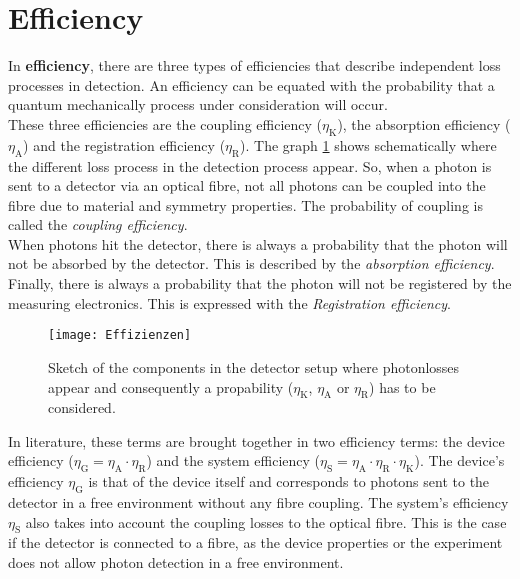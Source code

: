 \section{Efficiency}
In \textbf{efficiency}, there are three types of efficiencies that describe independent loss processes in detection.
An efficiency can be equated with the probability that a quantum mechanically process under consideration will occur.\\
These three efficiencies are the coupling efficiency ($\eta_{\text{K}}$),
the absorption efficiency ($\eta_{\text{A}}$) and the registration efficiency ($\eta_{\text{R}}$).
The graph \ref{fig: single_efficiency_terms} shows schematically where the different loss process in the detection
process appear. So, when a photon is sent to a detector via an optical fibre, not all photons can be coupled into the
fibre due to material and symmetry properties.
The probability of coupling is called the \textit{coupling efficiency}. \\
When photons hit the detector, there is always a probability that the photon will not be absorbed by the detector.
This is described by the \textit{absorption efficiency}. \\
Finally, there is always a probability that the photon will not be registered by the measuring electronics.
This is expressed with the \textit{Registration efficiency}. \\

\begin{figure}[hhh]
\texttt{[image: Effizienzen]}
\caption{Sketch of the components in the detector setup where photonlosses appear and consequently a propability
 ($\eta_{\text{K}}$, $\eta_{\text{A}}$ or $\eta_{\text{R}}$) has to be considered.}
\label{fig: single_efficiency_terms}
\end{figure}

In literature, these terms are brought together in two efficiency terms: the device efficiency
($\eta_{\text{G}} = \eta_{\text{A}} \cdot \eta_{\text{R}}$) and the system efficiency
($\eta_{\text{S}} = \eta_{\text{A}} \cdot \eta_{\text{R}} \cdot \eta_{\text{K}}$).
The device's efficiency $\eta_{\text{G}}$ is that of the device itself and corresponds to photons sent
to the detector in a free environment without any fibre coupling.
The system's efficiency $\eta_{\text{S}}$ also takes into account the coupling losses to the optical fibre.
This is the case if the detector is connected to a fibre, as the device properties or the experiment does not allow
photon detection in a free environment.\\

